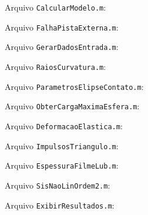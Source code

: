 \documentclass[12pt,oneside,english,brazil,lmodern,siglas,simbolos,cite=num]{ucsmonograph}
\begin{document}
	Arquivo \texttt{CalcularModelo.m}:
	
	
	Arquivo \texttt{FalhaPistaExterna.m}:
	
	
	Arquivo \texttt{GerarDadosEntrada.m}:
	
	
	Arquivo \texttt{RaiosCurvatura.m}:
	
	
	Arquivo \texttt{ParametrosElipseContato.m}:
	
	
	Arquivo \texttt{ObterCargaMaximaEsfera.m}:
	
	
	Arquivo \texttt{DeformacaoElastica.m}:
	
	
	Arquivo \texttt{ImpulsosTriangulo.m}:
	
	
	Arquivo \texttt{EspessuraFilmeLub.m}:
	
	
	Arquivo \texttt{SisNaoLinOrdem2.m}:
	
	
	Arquivo \texttt{ExibirResultados.m}:
	
\end{document}

